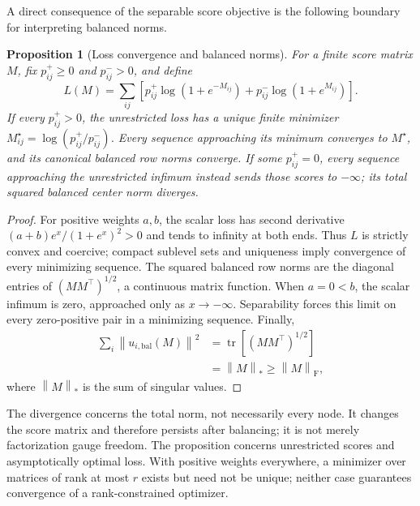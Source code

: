 \documentclass[aps,pre,reprint,superscriptaddress,longbibliography]{revtex4-2}
\newcommand{\norm}[1]{\left\lVert #1 \right\rVert}
\newtheorem{proposition}[theorem]{Proposition}
\begin{document}
A direct consequence of the separable score objective is the following boundary for interpreting balanced norms.
\begin{proposition}[Loss convergence and balanced norms]
\label{prop:loss-norm-boundary}
For a finite score matrix \(M\), fix \(p^+_{ij}\geq0\) and \(p^-_{ij}>0\), and define
\begin{equation}
    L(M)=\sum_{ij}\left[p^+_{ij}\log(1+e^{-M_{ij}})
    +p^-_{ij}\log(1+e^{M_{ij}})\right].
    \label{eq:score-loss}
\end{equation}
If every \(p^+_{ij}>0\), the unrestricted loss has a unique finite minimizer \(M^\star_{ij}=\log(p^+_{ij}/p^-_{ij})\).
Every sequence approaching its minimum converges to \(M^\star\), and its canonical balanced row norms converge.
If some \(p^+_{ij}=0\), every sequence approaching the unrestricted infimum instead sends those scores to \(-\infty\); its total squared balanced center norm diverges.
\end{proposition}

\begin{proof}
For positive weights \(a,b\), the scalar loss has second derivative \((a+b)e^x/(1+e^x)^2>0\) and tends to infinity at both ends.
Thus \(L\) is strictly convex and coercive; compact sublevel sets and uniqueness imply convergence of every minimizing sequence.
The squared balanced row norms are the diagonal entries of \((MM^\top)^{1/2}\), a continuous matrix function.
When \(a=0<b\), the scalar infimum is zero, approached only as \(x\to-\infty\).
Separability forces this limit on every zero-positive pair in a minimizing sequence.
Finally,
\begin{equation}
    \begin{aligned}
    \sum_i\norm{u_{i,\mathrm{bal}}(M)}^2
    &=\operatorname{tr}\!\left[(MM^\top)^{1/2}\right]\\
    &=\norm{M}_*\geq\norm{M}_{\mathrm F},
    \end{aligned}
\end{equation}
where \(\norm{M}_*\) is the sum of singular values.
\end{proof}

The divergence concerns the total norm, not necessarily every node.
It changes the score matrix and therefore persists after balancing; it is not merely factorization gauge freedom.
The proposition concerns unrestricted scores and asymptotically optimal loss.
With positive weights everywhere, a minimizer over matrices of rank at most \(r\) exists but need not be unique; neither case guarantees convergence of a rank-constrained optimizer.
\end{document}
